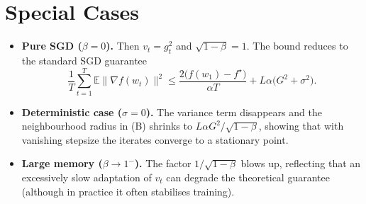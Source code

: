\documentclass{article}
\begin{document}
\section*{Special Cases}
\begin{itemize}
\item \textbf{Pure SGD ($\beta=0$).} Then $v_{t}=g_{t}^{2}$ and $\sqrt{1-\beta}=1$. The bound reduces to the standard SGD guarantee
\[
\frac{1}{T}\sum_{t=1}^{T}\mathbb{E}\|\nabla f(w_{t})\|^{2}
\le
\frac{2\big(f(w_{1})-f^{\star}\big)}{\alpha T}
+L\alpha\big(G^{2}+\sigma^{2}\big).
\]
\item \textbf{Deterministic case ($\sigma=0$).} The variance term disappears and the neighbourhood radius in (B) shrinks to $L\alpha G^{2}/\sqrt{1-\beta}$, showing that with vanishing stepsize the iterates converge to a stationary point.
\item \textbf{Large memory ($\beta\rightarrow1^{-}$).} The factor $1/\sqrt{1-\beta}$ blows up, reflecting that an excessively slow adaptation of $v_{t}$ can degrade the theoretical guarantee (although in practice it often stabilises training).
\end{itemize}
\end{document}
